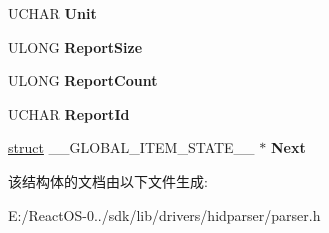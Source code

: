 \begin{DoxyCompactItemize}
U\+C\+H\+AR {\bfseries Unit}
\item 
\mbox{\label{struct_____g_l_o_b_a_l___i_t_e_m___s_t_a_t_e___abbeabef1610b39e3e52199652fc4237d}} 
U\+L\+O\+NG {\bfseries Report\+Size}
\item 
\mbox{\label{struct_____g_l_o_b_a_l___i_t_e_m___s_t_a_t_e___af492e9b771ac99a429adee5f3ef549cd}} 
U\+L\+O\+NG {\bfseries Report\+Count}
\item 
\mbox{\label{struct_____g_l_o_b_a_l___i_t_e_m___s_t_a_t_e___a418f78e3a148469b60654a2037ee170f}} 
U\+C\+H\+AR {\bfseries Report\+Id}
\item 
\mbox{\label{struct_____g_l_o_b_a_l___i_t_e_m___s_t_a_t_e___a99708cc9d58fd5d209c8a6b7c6d825c5}} 
\hyperlink{interfacestruct}{struct} \+\_\+\+\_\+\+G\+L\+O\+B\+A\+L\+\_\+\+I\+T\+E\+M\+\_\+\+S\+T\+A\+T\+E\+\_\+\+\_\+ $\ast$ {\bfseries Next}
\end{DoxyCompactItemize}


该结构体的文档由以下文件生成\+:\begin{DoxyCompactItemize}
\item 
E\+:/\+React\+O\+S-\/0../sdk/lib/drivers/hidparser/parser.\+h\end{DoxyCompactItemize}
